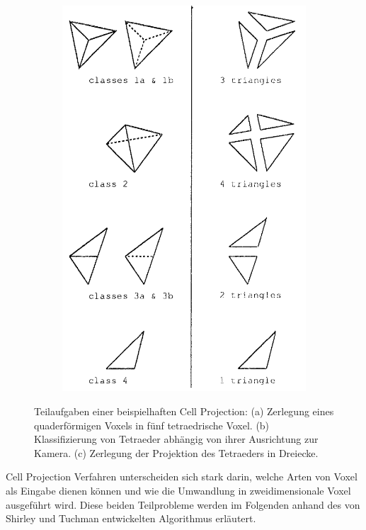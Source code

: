\documentclass[a4paper,fontsize=12pt,toc=bib,parskip=half,ngerman]{scrartcl}
\begin{document}
\begin{figure}
\begin{subfigure}{0.3\textwidth}
		\subcaption{}
		\label{Classes}
	\end{subfigure}
	\begin{subfigure}{0.3\textwidth}
		\centering
		\includegraphics[width=\textwidth]{pictures/Triangle.png}
		\subcaption{}
		\label{Triangle}
	\end{subfigure}
	\caption{Teilaufgaben einer beispielhaften Cell Projection: (a) Zerlegung eines quaderf\"ormigen Voxels in f\"unf tetraedrische Voxel. (b) Klassifizierung von Tetraeder abh\"angig von ihrer Ausrichtung zur Kamera. (c) Zerlegung der Projektion des Tetraeders in Dreiecke.}
\end{figure}

Cell Projection Verfahren unterscheiden sich stark darin, welche Arten von Voxel als Eingabe dienen k\"onnen und wie die Umwandlung in zweidimensionale Voxel ausgef\"uhrt wird. Diese beiden Teilprobleme werden im Folgenden anhand des von Shirley und Tuchman \cite{shirley1990polygonal} entwickelten Algorithmus erl\"autert.
\end{document}
